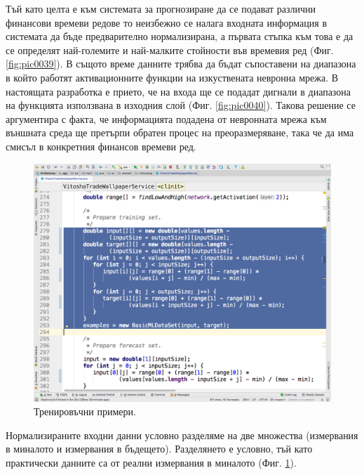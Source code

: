 \documentclass[book,14pt,oneside,openany]{memoir}
\begin{document}
Тъй като целта е към системата за прогнозиране да се подават различни финансови времеви редове то неизбежно се налага входната информация в системата да бъде предварително нормализирана, а първата стъпка към това е да се определят най-големите и най-малките стойности във времевия ред (Фиг. \ref{fig:pic0039}). В същото време данните трябва да бъдат съпоставени на диапазона в който работят активационните функции на изкуствената невронна мрежа. В настоящата разработка е прието, че на входа ще се подадат дигнали в диапазона на функцията използвана в изходния слой (Фиг. \ref{fig:pic0040}). Такова решение се аргументира с факта, че информацията подадена от невронната мрежа към външната среда ще претърпи обратен процес на преоразмеряване, така че да има смисъл в конкретния финансов времеви ред.

\begin{figure}[h]
  \centering
  \includegraphics[height=0.45\pdfpageheight]{pic0041}
  \caption{Тренировъчни примери.}
\label{fig:pic0041}
\end{figure}
\FloatBarrier

Нормализираните входни данни условно разделяме на две множества (измервания в миналото и измервания в бъдещето). Разделянето е условно, тъй като практически данните са от реални измервания в миналото (Фиг. \ref{fig:pic0041}).
\end{document}
